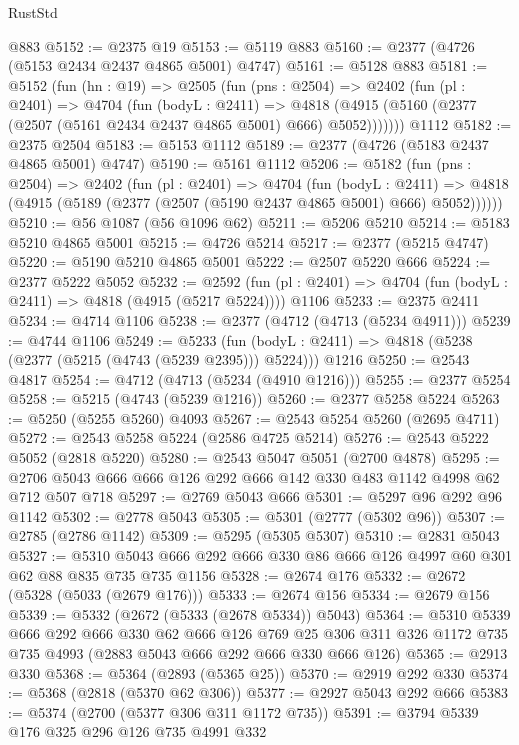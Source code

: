 \begin{lexlean}{RustStd}
\begin{coremodule}
    @883
@5152 := @2375 @19
@5153 := @5119 @883
@5160 := @2377 (@4726 (@5153 @2434 @2437 @4865 @5001) @4747)
@5161 := @5128 @883
@5181 := @5152
    (fun (hn : @19) =>
    @2505
      (fun (pns : @2504) =>
      @2402
        (fun (pl : @2401) =>
        @4704
          (fun (bodyL : @2411) =>
          @4818 (@4915 (@5160 (@2377 (@2507 (@5161 @2434 @2437 @4865 @5001) @666) @5052)))))))
    @1112
@5182 := @2375 @2504
@5183 := @5153 @1112
@5189 := @2377 (@4726 (@5183 @2437 @4865 @5001) @4747)
@5190 := @5161 @1112
@5206 := @5182
    (fun (pns : @2504) =>
    @2402
      (fun (pl : @2401) =>
      @4704
        (fun (bodyL : @2411) =>
        @4818 (@4915 (@5189 (@2377 (@2507 (@5190 @2437 @4865 @5001) @666) @5052))))))
@5210 := @56 @1087 (@56 @1096 @62)
@5211 := @5206 @5210
@5214 := @5183 @5210 @4865 @5001
@5215 := @4726 @5214
@5217 := @2377 (@5215 @4747)
@5220 := @5190 @5210 @4865 @5001
@5222 := @2507 @5220 @666
@5224 := @2377 @5222 @5052
@5232 := @2592
    (fun (pl : @2401) => @4704 (fun (bodyL : @2411) => @4818 (@4915 (@5217 @5224))))
    @1106
@5233 := @2375 @2411
@5234 := @4714 @1106
@5238 := @2377 (@4712 (@4713 (@5234 @4911)))
@5239 := @4744 @1106
@5249 := @5233
    (fun (bodyL : @2411) => @4818 (@5238 (@2377 (@5215 (@4743 (@5239 @2395))) @5224)))
    @1216
@5250 := @2543 @4817
@5254 := @4712 (@4713 (@5234 (@4910 @1216)))
@5255 := @2377 @5254
@5258 := @5215 (@4743 (@5239 @1216))
@5260 := @2377 @5258 @5224
@5263 := @5250 (@5255 @5260) @4093
@5267 := @2543 @5254 @5260 (@2695 @4711)
@5272 := @2543 @5258 @5224 (@2586 @4725 @5214)
@5276 := @2543 @5222 @5052 (@2818 @5220)
@5280 := @2543 @5047 @5051 (@2700 @4878)
@5295 := @2706 @5043 @666 @666 @126 @292 @666 @142 @330 @483 @1142 @4998 @62 @712 @507 @718
@5297 := @2769 @5043 @666
@5301 := @5297 @96 @292 @96 @1142
@5302 := @2778 @5043
@5305 := @5301 (@2777 (@5302 @96))
@5307 := @2785 (@2786 @1142)
@5309 := @5295 (@5305 @5307)
@5310 := @2831 @5043
@5327 := @5310 @5043 @666 @292 @666 @330 @86 @666 @126 @4997 @60 @301 @62 @88 @835 @735 @735 @1156
@5328 := @2674 @176
@5332 := @2672 (@5328 (@5033 (@2679 @176)))
@5333 := @2674 @156
@5334 := @2679 @156
@5339 := @5332 (@2672 (@5333 (@2678 @5334)) @5043)
@5364 := @5310
    @5339
    @666
    @292
    @666
    @330
    @62
    @666
    @126
    @769
    @25
    @306
    @311
    @326
    @1172
    @735
    @735
    @4993
    (@2883 @5043 @666 @292 @666 @330 @666 @126)
@5365 := @2913 @330
@5368 := @5364 (@2893 (@5365 @25))
@5370 := @2919 @292 @330
@5374 := @5368 (@2818 (@5370 @62 @306))
@5377 := @2927 @5043 @292 @666
@5383 := @5374 (@2700 (@5377 @306 @311 @1172 @735))
@5391 := @3794 @5339 @176 @325 @296 @126 @735 @4991 @332

\end{coremodule}
\end{lexlean}
